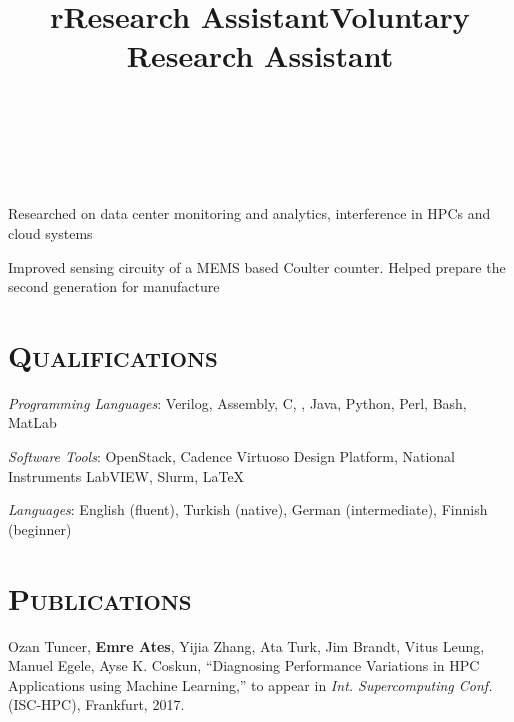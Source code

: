 \begin{resume}
	\begin{formatb}
		\title{r}\\
		\\
		\body\\
	\end{formatb}
	
	\title{Research Assistant}
	\begin{position}
		Researched on data center monitoring and analytics, interference in HPCs and
    cloud systems 
	\end{position}
	
	\title{Voluntary Research Assistant}
	\begin{position}
		Improved sensing circuity of a MEMS based Coulter counter. Helped prepare
    the second generation for manufacture 
	\end{position}
	
	\section{\textsc{Qualifications}}
	
	\emph{Programming Languages}: Verilog, Assembly, C, \Cplusplus, Java, Python,
	Perl, Bash, MatLab
	\setlength{\parskip}{1mm}
	
	\emph{Software Tools}: OpenStack, Cadence Virtuoso Design Platform, National
	Instruments LabVIEW, Slurm, \LaTeX
	
	
	
	\emph{Languages}: English (fluent), Turkish (native), German (intermediate),
  Finnish (beginner) 

  \section{\textsc{Publications}}
  Ozan Tuncer, \textbf{Emre Ates}, Yijia Zhang, Ata Turk, Jim Brandt, Vitus
  Leung, Manuel Egele, Ayse K. Coskun, ``Diagnosing Performance Variations in
  HPC Applications using Machine Learning,'' to appear in \textit{Int.
    Supercomputing Conf.} (ISC-HPC), Frankfurt, 2017.
	

\end{resume}
